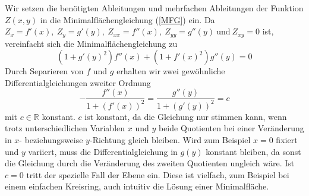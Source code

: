 \begin{refsection}
Wir setzen die benötigten Ableitungen und mehrfachen Ableitungen der Funktion $Z(x,y)$ in die Minimalflächengleichung (\ref{MFG}) ein. Da $ Z_x = f'(x),\ Z_y = g'(y),\ Z_{xx}=f''(x),\ Z_{yy} = g''(y) \ \text{und} \ Z_{xy}=0$ ist, vereinfacht sich die Minimalflächengleichung zu 
\begin{equation}\label{MFG Scherk}
(1+g'(y)^2)f''(x)+(1+f'(x)^2)g''(y)=0
\end{equation}
Durch Separieren von $f$ und $g$ erhalten wir zwei gewöhnliche Differentialgleichungen zweiter Ordnung
\begin{equation}\label{MFG Scherk2}
-\dfrac{f''(x)}{1+(f'(x))^2}=\dfrac{g''(y)}{1+(g'(y))^2}=c
\end{equation}
mit $c \in \mathbb{R}$ konstant. $c$ ist konstant, da die Gleichung nur stimmen kann, wenn trotz unterschiedlichen Variablen $x$ und $y$ beide Quotienten bei einer Veränderung in $x$- beziehungsweise $y$-Richtung gleich bleiben. Wird zum Beispiel $x=0$ fixiert und $y$ variiert, muss die Differentialgleichung in $g(y)$ konstant bleiben, da sonst die Gleichung durch die Veränderung des zweiten Quotienten ungleich wäre. Ist $c=0$ tritt der spezielle Fall der Ebene ein. Diese ist vielfach, zum Beispiel bei einem einfachen Kreisring, auch intuitiv die Lösung einer Minimalfläche.


\end{refsection}
